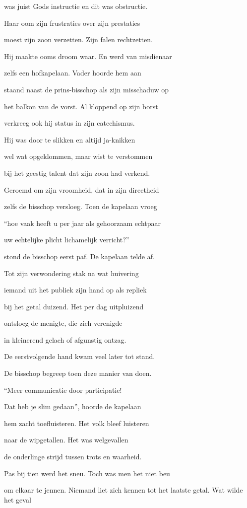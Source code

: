 was juist Gods instructie
en dit was obstructie.

Haar oom zijn frustraties
over zijn prestaties

moest zijn zoon verzetten.
Zijn falen rechtzetten.

Hij maakte ooms droom waar.
En werd van misdienaar

zelfs een hofkapelaan.
Vader hoorde hem aan

staand naast de prins-bisschop
als zijn misschaduw op

het balkon van de vorst.
Al kloppend op zijn borst

verkreeg ook hij status
in zijn catechismus.

Hij was door te slikken
en altijd ja-knikken

wel wat opgeklommen,
maar wist te verstommen

bij het geestig talent
dat zijn zoon had verkend.

Geroemd om zijn vroomheid,
dat in zijn directheid

zelfs de bisschop versloeg.
Toen de kapelaan vroeg

“hoe vaak heeft u per jaar
als gehoorzaam echtpaar

uw echtelijke plicht
lichamelijk verricht?”

stond de bisschop eerst paf.
De kapelaan telde af.

Tot zijn verwondering
stak na wat huivering

iemand uit het publiek
zijn hand op als repliek

bij het getal duizend.
Het per dag uitpluizend

ontsloeg de menigte,
die zich verenigde

in kleinerend gelach
of afgunstig ontzag.

De eerstvolgende hand
kwam veel later tot stand.

De bisschop begreep toen
deze manier van doen.

“Meer communicatie
door participatie!

Dat heb je slim gedaan”,
hoorde de kapelaan

hem zacht toefluisteren.
Het volk bleef luisteren

naar de wipgetallen.
Het was welgevallen

de onderlinge strijd
tussen trots en waarheid.

Pas bij tien werd het sneu.
Toch was men het niet beu

om elkaar te jennen.
Niemand liet zich kennen
tot het laatste getal.
Wat wilde het geval

